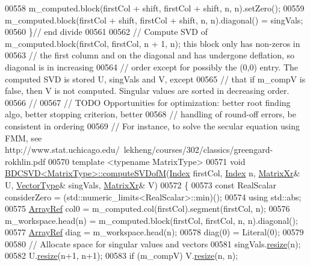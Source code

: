 \begin{DoxyCode}
00558   m\_computed.block(firstCol + shift, firstCol + shift, n, n).setZero();
00559   m\_computed.block(firstCol + shift, firstCol + shift, n, n).diagonal() = singVals;
00560 \}\textcolor{comment}{// end divide}
00561 
00562 \textcolor{comment}{// Compute SVD of m\_computed.block(firstCol, firstCol, n + 1, n); this block only has non-zeros in}
00563 \textcolor{comment}{// the first column and on the diagonal and has undergone deflation, so diagonal is in increasing}
00564 \textcolor{comment}{// order except for possibly the (0,0) entry. The computed SVD is stored U, singVals and V, except}
00565 \textcolor{comment}{// that if m\_compV is false, then V is not computed. Singular values are sorted in decreasing order.}
00566 \textcolor{comment}{//}
00567 \textcolor{comment}{// TODO Opportunities for optimization: better root finding algo, better stopping criterion, better}
00568 \textcolor{comment}{// handling of round-off errors, be consistent in ordering}
00569 \textcolor{comment}{// For instance, to solve the secular equation using FMM, see
       http://www.stat.uchicago.edu/~lekheng/courses/302/classics/greengard-rokhlin.pdf}
00570 \textcolor{keyword}{template} <\textcolor{keyword}{typename} MatrixType>
00571 \textcolor{keywordtype}{void} \hyperlink{group___s_v_d___module_class_eigen_1_1_b_d_c_s_v_d}{BDCSVD<MatrixType>::computeSVDofM}(\hyperlink{namespace_eigen_a62e77e0933482dafde8fe197d9a2cfde}{Index} firstCol, 
      \hyperlink{namespace_eigen_a62e77e0933482dafde8fe197d9a2cfde}{Index} n, \hyperlink{group___core___module}{MatrixXr}& U, \hyperlink{group___core___module}{VectorType}& singVals, \hyperlink{group___core___module}{MatrixXr}& V)
00572 \{
00573   \textcolor{keyword}{const} RealScalar considerZero = (std::numeric\_limits<RealScalar>::min)();
00574   \textcolor{keyword}{using} std::abs;
00575   \hyperlink{group___core___module_class_eigen_1_1_ref}{ArrayRef} col0 = m\_computed.col(firstCol).segment(firstCol, n);
00576   m\_workspace.head(n) =  m\_computed.block(firstCol, firstCol, n, n).diagonal();
00577   \hyperlink{group___core___module_class_eigen_1_1_ref}{ArrayRef} diag = m\_workspace.head(n);
00578   diag(0) = Literal(0);
00579 
00580   \textcolor{comment}{// Allocate space for singular values and vectors}
00581   singVals.\hyperlink{class_eigen_1_1_plain_object_base_a99d9054ee2d5a40c6e00ded0265e9cea}{resize}(n);
00582   U.\hyperlink{class_eigen_1_1_plain_object_base_a99d9054ee2d5a40c6e00ded0265e9cea}{resize}(n+1, n+1);
00583   \textcolor{keywordflow}{if} (m\_compV) V.\hyperlink{class_eigen_1_1_plain_object_base_a99d9054ee2d5a40c6e00ded0265e9cea}{resize}(n, n);

\end{DoxyCode}
